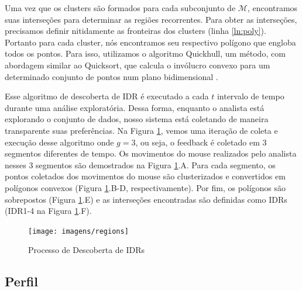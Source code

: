 Uma vez que os clusters são formados para cada subconjunto de $\mathcal{M}$, encontramos suas interseções para determinar as regiões recorrentes. Para obter as interseções, precisamos definir nitidamente as fronteiras dos clusters (linha \ref{ln:poly}). Portanto para cada cluster, nós encontramos seu respectivo polígono que engloba todos os pontos. Para isso, utilizamos o algoritmo Quickhull, um método, com abordagem similar ao Quicksort, que calcula o invólucro convexo para um determinado conjunto de pontos num plano bidimensional \cite{Barber:1996}.

Esse algoritmo de descoberta de IDR é executado a cada $t$ intervalo de tempo durante uma análise exploratória. Dessa forma, enquanto o analista está explorando o conjunto de dados, nosso sistema está coletando de maneira transparente suas preferências. Na Figura \ref{fig:descoberta-idr}, vemos uma iteração de coleta e execução desse algoritmo onde $g = 3$, ou seja, o feedback é coletado em 3 segmentos diferentes de tempo. Os movimentos do mouse realizados pelo analista nesses 3 segmentos são demostrados na Figura \ref{fig:descoberta-idr}.A. Para cada segmento, os pontos coletados dos movimentos do mouse são clusterizados e convertidos em polígonos convexos (Figura \ref{fig:descoberta-idr}.B-D, respectivamente). Por fim, os polígonos são sobrepostos (Figura \ref{fig:descoberta-idr}.E) e as interseções encontradas são definidas como IDRs (IDR1-4 na Figura \ref{fig:descoberta-idr}.F).

\begin{figure}[t]
	\centering
	\texttt{[image: imagens/regions]}
	\caption{Processo de Descoberta de IDRs}
	\label{fig:descoberta-idr}
\end{figure}


\subsection{Perfil}


